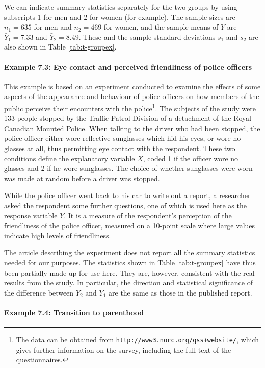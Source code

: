 \documentclass[11pt,a4paper,openany]{book}
\let\oldparagraph\paragraph
\renewcommand{\paragraph}[1]{\oldparagraph{#1}\mbox{}}
\let\rmarkdownfootnote\footnote%
\def\footnote{\protect\rmarkdownfootnote}
\begin{document}
We can indicate summary statistics separately for the two groups by
using subscripts 1 for men and 2 for women (for example). The sample
sizes are \(n_{1}=635\) for men and \(n_{2}=469\) for women, and the
sample means of \(Y\) are \(\bar{Y}_{1}=7.33\) and \(\bar{Y}_{2}=8.49\).
These and the sample standard deviations \(s_{1}\) and \(s_{2}\) are
also shown in Table \ref{tab:t-groupex}.

\paragraph{Example 7.3: Eye contact and perceived friendliness of police
officers}\label{p-ex73}

This example is based on an experiment conducted to examine the effects
of some aspects of the appearance and behaviour of police officers on
how members of the public perceive their encounters with the
police\footnote{The data can be obtained from
  \texttt{http://www3.norc.org/gss+website/}, which gives further
  information on the survey, including the full text of the
  questionnaires.}. The subjects of the study were 133 people stopped by
the Traffic Patrol Division of a detachment of the Royal Canadian
Mounted Police. When talking to the driver who had been stopped, the
police officer either wore reflective sunglasses which hid his eyes, or
wore no glasses at all, thus permitting eye contact with the respondent.
These two conditions define the explanatory variable \(X\), coded 1 if
the officer wore no glasses and 2 if he wore sunglasses. The choice of
whether sunglasses were worn was made at random before a driver was
stopped.

While the police officer went back to his car to write out a report, a
researcher asked the respondent some further questions, one of which is
used here as the response variable \(Y\). It is a measure of the
respondent's perception of the friendliness of the police officer,
measured on a 10-point scale where large values indicate high levels of
friendliness.

The article describing the experiment does not report all the summary
statistics needed for our purposes. The statistics shown in Table
\ref{tab:t-groupex} have thus been partially made up for use here. They
are, however, consistent with the real results from the study. In
particular, the direction and statistical significance of the difference
between \(\bar{Y}_{2}\) and \(\bar{Y}_{1}\) are the same as those in the
published report.

\hypertarget{p-dependentex}{\paragraph{Example 7.4: Transition to
parenthood}\label{p-dependentex}}
\end{document}
